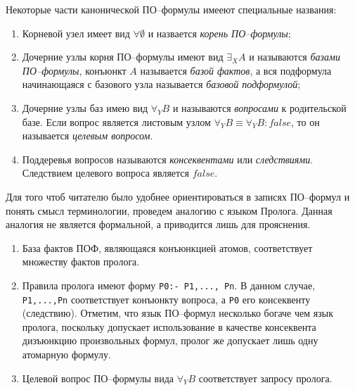 Некоторые части канонической ПО--формулы имееют специальные названия:
\begin{enumerate}
\item Корневой узел имеет вид $\forall \emptyset$ и назвается {\em корень ПО--формулы};

\item Дочерние узлы корня ПО--формулы имеют вид $\exists_XA$ и называются {\em базами ПО--формулы}, конъюнкт $A$ называется {\em базой фактов}, а вся подформула начинающаяся с базового узла называется {\em базовой подформулой};

\item Дочерние узлы баз имею вид $\forall_YB$ и называются {\em вопросами} к родительской базе. Если вопрос является листовым узлом $\forall_YB \equiv \forall_YB\colon false$, то он называется {\em целевым вопросом}. %

\item Поддеревья вопросов называются {\em консеквентами} или {\em следствиями}. Следствием целевого вопроса является $false$.

\end{enumerate}


Для того чтоб читателю было удобнее ориентироваться в записях ПО--формул и понять смысл терминологии, проведем аналогию с языком Пролога. Данная аналогия не является формальной, а приводится лишь для прояснения.

\begin{enumerate}
\item База фактов ПОФ, являющаяся конъюнкцией атомов, соответствует множеству фактов пролога.
\item Правила пролога имеют форму \texttt{P0:- P1,..., Pn}. В данном случае, \texttt{P1,...,Pn} соответствует конъюнкту вопроса, а \texttt{P0} его консеквенту (следствию). Отметим, что язык ПО--формул несколько богаче чем язык пролога, поскольку допускает использование в качестве консеквента дизъюнкцию произвольных формул, пролог же допускает лишь одну атомарную формулу.
\item Целевой вопрос ПО--формулы вида $\forall_YB$ соответствует запросу пролога.
\end{enumerate}

